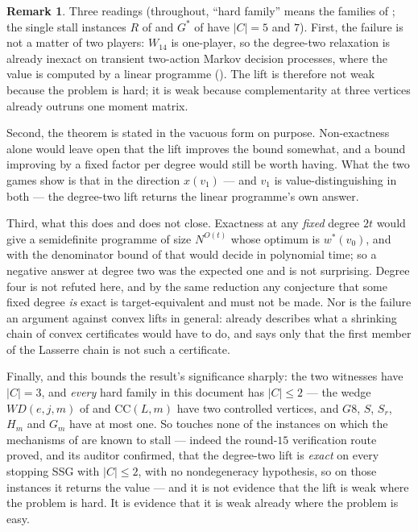 \documentclass[11pt]{article}
\theoremstyle{plain}
\theoremstyle{definition}
\newtheorem{remark}[theorem]{Remark}
\begin{document}
\begin{remark}\label{rem:lasserre}
Three readings (throughout, ``hard family'' means the families of
; the single stall instances $R$ of  and
$G^{\ast}$ of  have $|C|=5$ and $7$). First, the failure is not a matter of two players: $W_{14}$
is one-player, so the degree-two relaxation is already inexact on transient
two-action Markov decision processes, where the value is computed by a
linear programme (). The lift is therefore not weak
because the problem is hard; it is weak because complementarity at three
vertices already outruns one moment matrix.

Second, the theorem is stated in the vacuous form on purpose. Non-exactness
alone would leave open that the lift improves the bound somewhat, and a
bound improving by a fixed factor per degree would still be worth having.
What the two games show is that in the direction $x(v_1)$ --- and $v_1$ is
value-distinguishing in both --- the degree-two lift returns the linear
programme's own answer.

Third, what this does and does not close. Exactness at any \emph{fixed}
degree $2t$ would give a semidefinite programme of size $N^{O(t)}$ whose
optimum is $w^\ast(v_0)$, and with the denominator bound of
 that would decide  in
polynomial time; so a negative answer at degree two was the expected one and
is not surprising. Degree four is not refuted here, and by the same
reduction any conjecture that some fixed degree \emph{is} exact is
target-equivalent and must not be made. Nor is the failure an argument
against convex lifts in general:  already
describes what a shrinking chain of convex certificates would have to do,
and  says only that the first member of the
Lasserre chain is not such a certificate.

Finally, and this bounds the result's significance sharply: the two
witnesses have $|C|=3$, and \emph{every} hard family in this document has
$|C|\le2$ --- the wedge $WD(e,j,m)$ of  and
$\mathrm{CC}(L,m)$ have two controlled vertices, and $G8$, $S$, $S_r$,
$H_m$ and $G_m$ have at most one. So  touches
none of the instances on which the mechanisms of  are known
to stall --- indeed the round-$15$ verification route proved, and its
auditor confirmed, that the degree-two lift is \emph{exact} on every
stopping SSG with $|C|\le2$, with no nondegeneracy hypothesis, so on those
instances it returns the value --- and it is not evidence that the lift is
weak where the problem is hard. It is evidence that it is weak already
where the problem is easy.
\end{remark}
\end{document}
